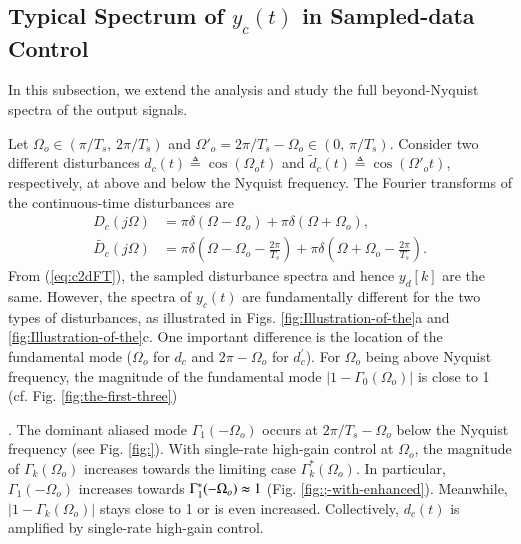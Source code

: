 \documentclass [11pt, proquest] {uwthesis}[2020/02/24]
\begin{document}
\subsection{\label{subsec:Typical-spectrum-of}Typical Spectrum of $y_{c}(t)$
in Sampled-data Control}

In this subsection, we extend the analysis and study the full beyond-Nyquist
spectra of the output signals.

Let $\Omega_{o}\in(\pi/T_{s},\,2\pi/T_{s})$ and $\Omega'_{o}=2\pi/T_{s}-\Omega_{o}\in(0,\,\pi/T_{s})$.
Consider two different disturbances $d_{c}(t)\triangleq\cos(\Omega_{o}t)$
and $\tilde{d}_{c}(t)\triangleq\cos(\Omega'_{o}t)$, respectively,
at above and below the Nyquist frequency. The Fourier transforms of
the continuous-time disturbances are
\begin{align*}
D_{c}(j\Omega) & =\pi\delta(\Omega-\Omega_{o})+\pi\delta(\Omega+\Omega_{o}),\\
\tilde{D_{c}}(j\Omega) & =\pi\delta(\Omega-\Omega_{o}-\frac{2\pi}{T_{s}})+\pi\delta(\Omega+\Omega_{o}-\frac{2\pi}{T_{s}}).
\end{align*}
From (\ref{eq:c2dFT}), the sampled disturbance spectra and hence
$y_{d}[k]$ are the same. However, the spectra of $y_{c}(t)$ are
fundamentally different for the two types of disturbances, as illustrated
in Figs. \ref{fig:Illustration-of-the}a and \ref{fig:Illustration-of-the}c.
One important difference is the location of the fundamental mode ($\Omega_{o}$
for $d_{c}$ and $2\pi-\Omega_{o}$ for $d_{c}^{'}$). For $\Omega_{o}$
being above Nyquist frequency, the magnitude of the fundamental mode
$\left|1-\Gamma_{0}(\Omega_{o})\right|$ is close to 1 (cf. Fig. \ref{fig:the-first-three})%

. The dominant aliased mode $\Gamma_{1}(-\Omega_{o})$ occurs at $2\pi/T_{s}-\Omega_{o}$
below the Nyquist frequency (see Fig. \ref{fig:}). With single-rate
high-gain control at $\Omega_{o}$, the magnitude of $\Gamma_{k}(\Omega_{o})$
increases towards the limiting case $\Gamma_{k}^{*}(\Omega_{o})$.
In particular, $\Gamma_{1}(-\Omega_{o})$ increases towards $\Gamma_{1}^{*}(-\Omega_{o})\thickapprox1$
(Fig. \ref{fig:;-with-enhanced}). Meanwhile, $|1-\Gamma_{k}(\Omega_{o})|$
stays close to 1 or is even increased. Collectively, $d_{c}(t)$ is
amplified by single-rate high-gain control.
\end{document}
